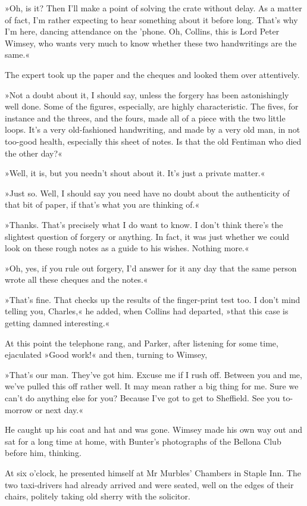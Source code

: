 »Oh, is it? Then I'll make a point of solving the crate without delay. As a matter of fact, I'm rather expecting to hear something about it before long. That's why I'm here, dancing attendance on the 'phone. Oh, Collins, this is Lord Peter Wimsey, who wants very much to know whether these two handwritings are the same.«

The expert took up the paper and the cheques and looked them over attentively.

»Not a doubt about it, I should say, unless the forgery has been astonishingly well done. Some of the figures, especially, are highly characteristic. The fives, for instance and the threes, and the fours, made all of a piece with the two little loops. It's a very old-fashioned handwriting, and made by a very old man, in not too-good health, especially this sheet of notes. Is that the old Fentiman who died the other day?«

»Well, it is, but you needn't shout about it. It's just a private matter.«

»Just so. Well, I should say you need have no doubt about the authenticity of that bit of paper, if that's what you are thinking of.«

»Thanks. That's precisely what I do want to know. I don't think there's the slightest question of forgery or anything. In fact, it was just whether we could look on these rough notes as a guide to his wishes. Nothing more.«

»Oh, yes, if you rule out forgery, I'd answer for it any day that the same person wrote all these cheques and the notes.«

»That's fine. That checks up the results of the finger-print test too. I don't mind telling you, Charles,« he added, when Collins had departed, »that this case is getting damned interesting.«

At this point the telephone rang, and Parker, after listening for some time, ejaculated »Good work!« and then, turning to Wimsey,

»That's our man. They've got him. Excuse me if I rush off. Between you and me, we've pulled this off rather well. It may mean rather a big thing for me. Sure we can't do anything else for you? Because I've got to get to Sheffield. See you to-morrow or next day.«

He caught up his coat and hat and was gone. Wimsey made his own way out and sat for a long time at home, with Bunter's photographs of the Bellona Club before him, thinking.

At six o'clock, he presented himself at Mr Murbles' Chambers in Staple Inn. The two taxi-drivers had already arrived and were seated, well on the edges of their chairs, politely taking old sherry with the solicitor.

